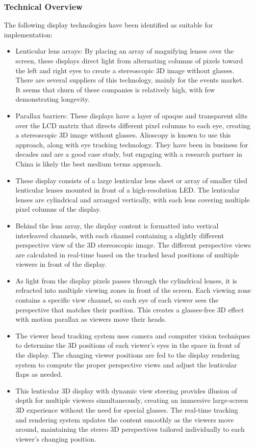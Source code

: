 \subsubsection{Technical Overview}
The following display technologies have been identified as suitable for implementation:
\begin{itemize}
    \item Lenticular lens arrays: By placing an array of magnifying lenses over the screen, these displays direct light from alternating columns of pixels toward the left and right eyes to create a stereoscopic 3D image without glasses. There are several suppliers of this technology, mainly for the events market. It seems that churn of these companies is relatively high, with few demonstrating longevity.
    \item Parallax barriers: These displays have a layer of opaque and transparent slits over the LCD matrix that directs different pixel columns to each eye, creating a stereoscopic 3D image without glasses. Alioscopy is known to use this approach, along with eye tracking technology. They have been in business for decades and are a good case study, but engaging with a research partner in China is likely the best medium terms approach.
  \item These display consists of a large lenticular lens sheet or array of smaller tiled lenticular lenses mounted in front of a high-resolution LED. The lenticular lenses are cylindrical and arranged vertically, with each lens covering multiple pixel columns of the display.

\item Behind the lens array, the display content is formatted into vertical interleaved channels, with each channel containing a slightly different perspective view of the 3D stereoscopic image. The different perspective views are calculated in real-time based on the tracked head positions of multiple viewers in front of the display.
\item As light from the display pixels passes through the cylindrical lenses, it is refracted into multiple viewing zones in front of the screen. Each viewing zone contains a specific view channel, so each eye of each viewer sees the perspective that matches their position. This creates a glasses-free 3D effect with motion parallax as viewers move their heads.

\item The viewer head tracking system uses camera and computer vision techniques to determine the 3D positions of each viewer's eyes in the space in front of the display. The changing viewer positions are fed to the display rendering system to compute the proper perspective views and adjust the lenticular flaps as needed.

\item This lenticular 3D display with dynamic view steering provides illusion of depth for multiple viewers simultaneously, creating an immersive large-screen 3D experience without the need for special glasses. The real-time tracking and rendering system updates the content smoothly as the viewers move around, maintaining the stereo 3D perspectives tailored individually to each viewer's changing position.

\end{itemize}
